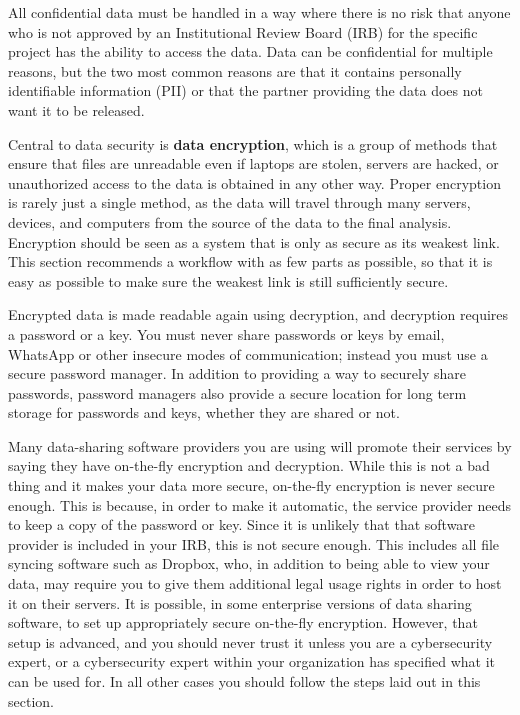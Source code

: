 All confidential data must be handled in a way where there is no risk that anyone who is
not approved by an Institutional Review Board (IRB)
for the specific project has the ability to access the data.
Data can be confidential for multiple reasons, but the two most
common reasons are that it contains personally identifiable information (PII)
or that the partner providing the data does not want it to be released.

Central to data security is \textbf{data encryption}, which is a group
of methods that ensure that files are unreadable even if laptops are stolen, servers
are hacked, or unauthorized access to the data is obtained in any other way.
Proper encryption is rarely just a single method,
as the data will travel through many servers, devices, and computers
from the source of the data to the final analysis.
Encryption should be seen as a system that is only as secure as its weakest link.
This section recommends a workflow with as few parts as possible,
so that it is easy as possible to make sure the weakest link is still sufficiently secure.

Encrypted data is made readable again using decryption,
and decryption requires a password or a key.
You must never share passwords or keys by email,
WhatsApp or other insecure modes of communication;
instead you must use a secure password manager.
In addition to providing a way to securely share passwords,
password managers also provide a secure location
for long term storage for passwords and keys, whether they are shared or not.

Many data-sharing software providers you are using will promote their services
by saying they have on-the-fly encryption and decryption.
While this is not a bad thing and it makes your data more secure,
on-the-fly encryption is never secure enough.
This is because, in order to make it automatic,
the service provider needs to keep a copy of the password or key.
Since it is unlikely that that software provider is included in your IRB,
this is not secure enough.
This includes all file syncing software such as Dropbox,
who, in addition to being able to view your data, may require
you to give them additional legal usage rights in order to host it on their servers.
It is possible, in some enterprise versions of data sharing software,
to set up appropriately secure on-the-fly encryption.
However, that setup is advanced, and you should never trust it
unless you are a cybersecurity expert,
or a cybersecurity expert within your organization
has specified what it can be used for.
In all other cases you should follow the steps laid out in this section.


